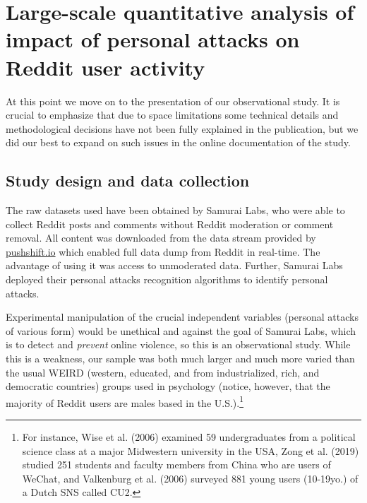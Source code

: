 \documentclass[10pt,dvipsnames]{scrartcl}
\begin{document}
\section{Large-scale quantitative analysis of impact of personal attacks on
Reddit user activity}
\label{quantanalysis}

At this point we move on to the presentation of our observational study.
It is crucial to emphasize that due to space limitations some technical
details and methodological decisions have not been fully explained in
the publication, but we did our best to expand on such issues in the
online documentation of the study.

\subsection{Study design and data collection}

The raw datasets used have been obtained by \textsf{Samurai Labs}, who
were able to collect \textsf{Reddit} posts and comments without
\textsf{Reddit} moderation or comment removal. All content was
downloaded from the data stream provided by \url{pushshift.io} which
enabled full data dump from Reddit in real-time. The advantage of using
it was access to unmoderated data. Further, \textsf{Samurai Labs}
deployed their personal attacks recognition algorithms to identify
personal attacks.

Experimental manipulation of the crucial independent variables (personal
attacks of various form) would be unethical and against the goal of
\textsf{Samurai Labs}, which is to detect and \emph{prevent} online
violence, so this is an observational study. While this is a weakness,
our sample was both much larger and much more varied than the usual
WEIRD (western, educated, and from industrialized, rich, and democratic
countries) groups used in psychology (notice, however, that the majority
of Reddit users are males based in the U.S.).\footnote{For instance,
  Wise et al. (2006) examined 59 undergraduates from a political science
  class at a major Midwestern university in the USA, Zong et al. (2019)
  studied 251 students and faculty members from China who are users of
  WeChat, and Valkenburg et al. (2006) surveyed 881 young users
  (10-19yo.) of a Dutch SNS called CU2.}
\end{document}
